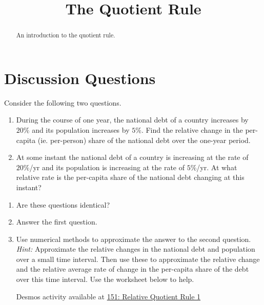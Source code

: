 \documentclass{ximera}
\title{The Quotient Rule}
\begin{document}
\begin{abstract}
An introduction to the quotient rule.
\end{abstract}
\maketitle

\section*{Discussion Questions}

\begin{question}  \label{QKDFmdeffef}
Consider the following two questions.

\begin{enumerate}
\item During the course of one year, the national debt of a country increases by $20\%$ and its population increases by $5\%$. Find the relative change in the per-capita (ie. per-person) share of the national debt over the one-year period.

\item At some instant the national debt of a country is increasing at the rate of $20\%$/yr and its population is increasing at the rate of $5\%$/yr. At what relative rate is the per-capita share of the national debt changing at this instant?
\end{enumerate}

\begin{enumerate}
\item Are these questions identical?

\item Answer the first question.

\item Use numerical methods to approximate the answer to the second question. \emph{Hint:} Approximate the relative changes in the national debt and population over a small time interval. Then use these to approximate the relative change and the relative average rate of change in the per-capita share of the debt over this time interval. Use the worksheet below to help.

\begin{onlineOnly}
    \begin{center}
\end{center}
\end{onlineOnly}

Desmos activity available at \href{https://www.desmos.com/calculator/rk4aocmccz}{151: Relative Quotient Rule 1}


\end{enumerate}
\end{question}
\end{document}
